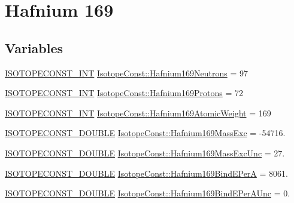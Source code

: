 \hypertarget{group___isotope_const-_hafnium-_hf169}{}\section{Hafnium 169}
\label{group___isotope_const-_hafnium-_hf169}
\subsection*{Variables}
\begin{DoxyCompactItemize}
\item 
\mbox{\hyperlink{group___isotope_const-_macros_ga5f18360b3e99483a35c32d789e62621c}{I\+S\+O\+T\+O\+P\+E\+C\+O\+N\+S\+T\+\_\+\+I\+NT}} \mbox{\hyperlink{group___isotope_const-_hafnium-_hf169_gae3d5f156bb205bbc30479764726c9a90}{Isotope\+Const\+::\+Hafnium169\+Neutrons}} = 97
\item 
\mbox{\hyperlink{group___isotope_const-_macros_ga5f18360b3e99483a35c32d789e62621c}{I\+S\+O\+T\+O\+P\+E\+C\+O\+N\+S\+T\+\_\+\+I\+NT}} \mbox{\hyperlink{group___isotope_const-_hafnium-_hf169_ga4b517e4e30ddd45c4fc50b9ab3625c45}{Isotope\+Const\+::\+Hafnium169\+Protons}} = 72
\item 
\mbox{\hyperlink{group___isotope_const-_macros_ga5f18360b3e99483a35c32d789e62621c}{I\+S\+O\+T\+O\+P\+E\+C\+O\+N\+S\+T\+\_\+\+I\+NT}} \mbox{\hyperlink{group___isotope_const-_hafnium-_hf169_ga5012f5253bf8d30a9d6e433e0fd92521}{Isotope\+Const\+::\+Hafnium169\+Atomic\+Weight}} = 169
\item 
\mbox{\hyperlink{group___isotope_const-_macros_ga8f45a7272ce02c0b4c65c44636ed719a}{I\+S\+O\+T\+O\+P\+E\+C\+O\+N\+S\+T\+\_\+\+D\+O\+U\+B\+LE}} \mbox{\hyperlink{group___isotope_const-_hafnium-_hf169_ga68866d23ca452f1222ebeec708ae1130}{Isotope\+Const\+::\+Hafnium169\+Mass\+Exc}} = -\/54716.
\item 
\mbox{\hyperlink{group___isotope_const-_macros_ga8f45a7272ce02c0b4c65c44636ed719a}{I\+S\+O\+T\+O\+P\+E\+C\+O\+N\+S\+T\+\_\+\+D\+O\+U\+B\+LE}} \mbox{\hyperlink{group___isotope_const-_hafnium-_hf169_gae74634cb35780cb9c6fd60bf5b322189}{Isotope\+Const\+::\+Hafnium169\+Mass\+Exc\+Unc}} = 27.
\item 
\mbox{\hyperlink{group___isotope_const-_macros_ga8f45a7272ce02c0b4c65c44636ed719a}{I\+S\+O\+T\+O\+P\+E\+C\+O\+N\+S\+T\+\_\+\+D\+O\+U\+B\+LE}} \mbox{\hyperlink{group___isotope_const-_hafnium-_hf169_ga6a3ea2ab672df7c4b85e9418566e32d4}{Isotope\+Const\+::\+Hafnium169\+Bind\+E\+PerA}} = 8061.
\item 
\mbox{\hyperlink{group___isotope_const-_macros_ga8f45a7272ce02c0b4c65c44636ed719a}{I\+S\+O\+T\+O\+P\+E\+C\+O\+N\+S\+T\+\_\+\+D\+O\+U\+B\+LE}} \mbox{\hyperlink{group___isotope_const-_hafnium-_hf169_ga13389e2662000e22d5ca7dae0eaeaaf7}{Isotope\+Const\+::\+Hafnium169\+Bind\+E\+Per\+A\+Unc}} = 0.

\end{DoxyCompactItemize}
